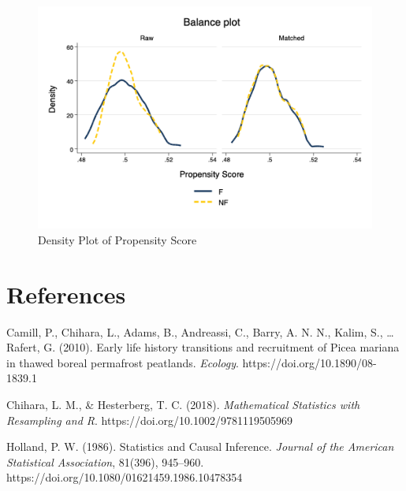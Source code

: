 \documentclass[
]{article}
\begin{document}
\begin{figure}
\centering
\includegraphics[width=0.75\linewidth]{mydensity.png}
\caption{Density Plot of Propensity Score}
\end{figure}



\hypertarget{references}{%
\section{References 🌲}\label{references}}

Camill, P., Chihara, L., Adams, B., Andreassi, C., Barry, A. N. N.,
Kalim, S., \ldots{} Rafert, G. (2010). Early life history transitions
and recruitment of Picea mariana in thawed boreal permafrost peatlands.
\emph{Ecology}. https://doi.org/10.1890/08-1839.1

Chihara, L. M., \& Hesterberg, T. C. (2018). \emph{Mathematical
Statistics with Resampling and R}. https://doi.org/10.1002/9781119505969

Holland, P. W. (1986). Statistics and Causal Inference. \emph{Journal of
the American Statistical Association}, 81(396), 945--960.
https://doi.org/10.1080/01621459.1986.10478354
\end{document}
